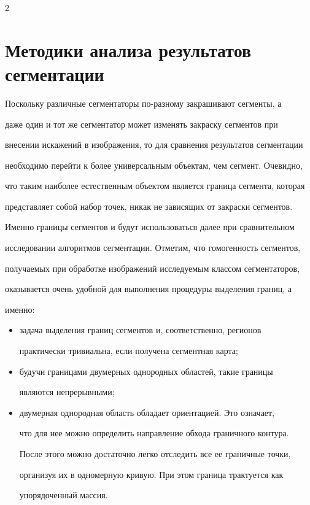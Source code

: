 \begin{multicols}{2}
  \section{Методики анализа результатов сегментации}


  


  Поскольку различные сегментаторы по-разному закрашивают сегменты, а 


даже один и тот же сегментатор может изменять закраску сегментов при 


внесении искажений в изображения, то для сравнения результатов сегментации 


необходимо перейти к более универсальным объектам, чем сегмент. Очевидно, 


что таким наиболее естественным объектом является граница сегмента, которая 


представляет собой набор точек, никак не зависящих от закраски сегментов. 


Именно границы сегментов и будут использоваться далее при сравнительном 


исследовании алгоритмов сегментации. Отметим, что гомогенность сегментов, 


получаемых при обработке изображений исследуемым классом сегментаторов, 


оказывается очень удобной для выполнения процедуры выделения границ, а 


именно:


  \begin{itemize}


\item задача выделения границ сегментов и, соответственно, регионов 


практически тривиальна, если получена сегментная карта;


\item будучи границами двумерных однородных областей, такие границы 


являются непрерывными;


\item двумерная однородная область обладает ориентацией. Это означает, 


что для нее можно определить направление обхода граничного контура. 


После этого можно достаточно легко отследить все ее граничные точки, 


организуя их в одномерную кривую. При этом граница трактуется как 


упорядоченный массив.



\end{itemize}
\end{multicols}
